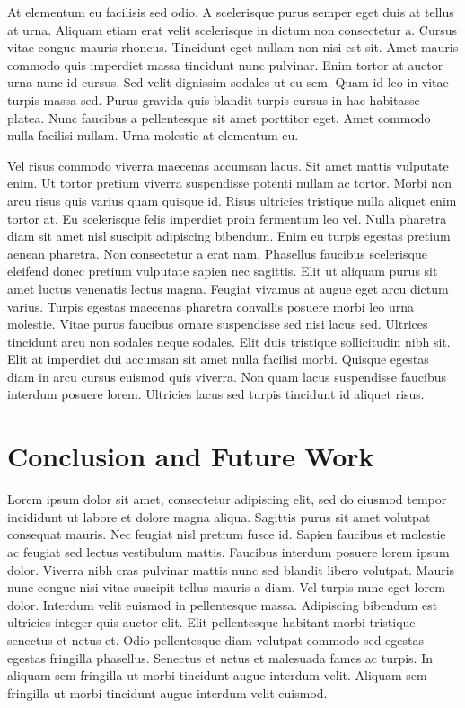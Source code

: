 \documentclass[conference]{IEEEtran}
\begin{document}
At elementum eu facilisis sed odio. A scelerisque purus semper eget duis at tellus at urna. Aliquam etiam erat velit scelerisque in dictum non consectetur a. Cursus vitae congue mauris rhoncus. Tincidunt eget nullam non nisi est sit. Amet mauris commodo quis imperdiet massa tincidunt nunc pulvinar. Enim tortor at auctor urna nunc id cursus. Sed velit dignissim sodales ut eu sem. Quam id leo in vitae turpis massa sed. Purus gravida quis blandit turpis cursus in hac habitasse platea. Nunc faucibus a pellentesque sit amet porttitor eget. Amet commodo nulla facilisi nullam. Urna molestie at elementum eu.

Vel risus commodo viverra maecenas accumsan lacus. Sit amet mattis vulputate enim. Ut tortor pretium viverra suspendisse potenti nullam ac tortor. Morbi non arcu risus quis varius quam quisque id. Risus ultricies tristique nulla aliquet enim tortor at. Eu scelerisque felis imperdiet proin fermentum leo vel. Nulla pharetra diam sit amet nisl suscipit adipiscing bibendum. Enim eu turpis egestas pretium aenean pharetra. Non consectetur a erat nam. Phasellus faucibus scelerisque eleifend donec pretium vulputate sapien nec sagittis. Elit ut aliquam purus sit amet luctus venenatis lectus magna. Feugiat vivamus at augue eget arcu dictum varius. Turpis egestas maecenas pharetra convallis posuere morbi leo urna molestie. Vitae purus faucibus ornare suspendisse sed nisi lacus sed. Ultrices tincidunt arcu non sodales neque sodales. Elit duis tristique sollicitudin nibh sit. Elit at imperdiet dui accumsan sit amet nulla facilisi morbi. Quisque egestas diam in arcu cursus euismod quis viverra. Non quam lacus suspendisse faucibus interdum posuere lorem. Ultricies lacus sed turpis tincidunt id aliquet risus.

\section{Conclusion and Future Work}
Lorem ipsum dolor sit amet, consectetur adipiscing elit, sed do eiusmod tempor incididunt ut labore et dolore magna aliqua. Sagittis purus sit amet volutpat consequat mauris. Nec feugiat nisl pretium fusce id. Sapien faucibus et molestie ac feugiat sed lectus vestibulum mattis. Faucibus interdum posuere lorem ipsum dolor. Viverra nibh cras pulvinar mattis nunc sed blandit libero volutpat. Mauris nunc congue nisi vitae suscipit tellus mauris a diam. Vel turpis nunc eget lorem dolor. Interdum velit euismod in pellentesque massa. Adipiscing bibendum est ultricies integer quis auctor elit. Elit pellentesque habitant morbi tristique senectus et netus et. Odio pellentesque diam volutpat commodo sed egestas egestas fringilla phasellus. Senectus et netus et malesuada fames ac turpis. In aliquam sem fringilla ut morbi tincidunt augue interdum velit. Aliquam sem fringilla ut morbi tincidunt augue interdum velit euismod.
\end{document}
